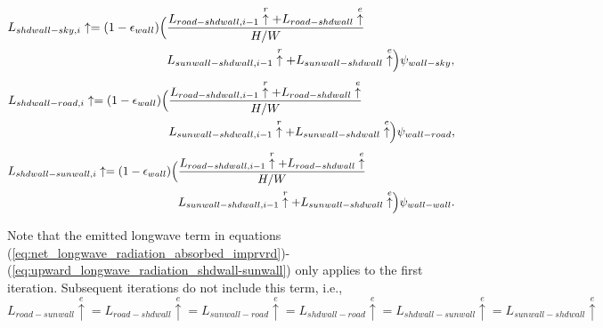 \documentclass[12pt,authoryear]{elsarticle}
\numberwithin{equation}{section} %
\begin{document}
\begin{equation}
\begin{aligned}
L_{shdwall-sky,i}\uparrow=(1-\epsilon_{wall})
\Bigl(
&\frac{L_{road-shdwall,i-1}\overset{r}{\uparrow}+L_{road-shdwall}\overset{e}{\uparrow}}{H/W} \\
&L_{sunwall-shdwall,i-1}\overset{r}{\uparrow}+L_{sunwall-shdwall}\overset{e}{\uparrow}
\Bigr) \psi_{wall-sky},
\end{aligned}
\end{equation}
\begin{equation}
\begin{aligned}
L_{shdwall-road,i}\uparrow=(1-\epsilon_{wall})
\Bigl(
&\frac{L_{road-shdwall,i-1}\overset{r}{\uparrow}+L_{road-shdwall}\overset{e}{\uparrow}}{H/W} \\
&L_{sunwall-shdwall,i-1}\overset{r}{\uparrow}+L_{sunwall-shdwall}\overset{e}{\uparrow}
\Bigr) \psi_{wall-road},
\end{aligned}
\end{equation}
\begin{equation}
\label{eq:upward_longwave_radiation_shdwall-sunwall}
\begin{aligned}
L_{shdwall-sunwall,i}\uparrow=(1-\epsilon_{wall})
\Bigl(
&\frac{L_{road-shdwall,i-1}\overset{r}{\uparrow}+L_{road-shdwall}\overset{e}{\uparrow}}{H/W} \\
&L_{sunwall-shdwall,i-1}\overset{r}{\uparrow}+L_{sunwall-shdwall}\overset{e}{\uparrow}
\Bigr) \psi_{wall-wall}.
\end{aligned}
\end{equation}

Note that the emitted longwave term in equations (\ref{eq:net_longwave_radiation_absorbed_imprvrd})-(\ref{eq:upward_longwave_radiation_shdwall-sunwall}) only applies to the first iteration. Subsequent iterations do not include this term, i.e.,
\begin{equation}
L_{road-sunwall}\overset{e}{\uparrow} = L_{road-shdwall}\overset{e}{\uparrow}=L_{sunwall-road}\overset{e}{\uparrow} = L_{shdwall-road}\overset{e}{\uparrow}=L_{shdwall-sunwall}\overset{e}{\uparrow}=L_{sunwall-shdwall}\overset{e}{\uparrow}
\end{equation}
\end{document}
